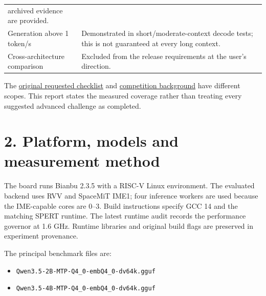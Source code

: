 \documentclass[10pt,a4paper]{article}
\providecommand{\tightlist}{\setlength{\itemsep}{0pt}\setlength{\parskip}{0pt}}
\begin{document}
\begin{longtable}[]{@{}ll@{}}
\begin{minipage}[t]{0.47\columnwidth}
archived evidence are provided.\strut
\end{minipage}\tabularnewline
\begin{minipage}[t]{0.47\columnwidth}\raggedright
Generation above 1 token/s\strut
\end{minipage} & \begin{minipage}[t]{0.47\columnwidth}\raggedright
Demonstrated in short/moderate-context decode tests; this is not
guaranteed at every long context.\strut
\end{minipage}\tabularnewline
\begin{minipage}[t]{0.47\columnwidth}\raggedright
Cross-architecture comparison\strut
\end{minipage} & \begin{minipage}[t]{0.47\columnwidth}\raggedright
Excluded from the release requirements at the user's direction.\strut
\end{minipage}\tabularnewline
\bottomrule
\end{longtable}

The
\href{https://github.com/MoyaMryia/riscv-accl/blob/main/spacemit/reports/2026-09-27-next-steps-and-measures.md}{original
requested checklist} and
\href{https://github.com/MoyaMryia/riscv-accl/blob/main/env/competition-background.md}{competition
background} have different scopes. This report states the measured
coverage rather than treating every suggested advanced challenge as
completed.

\hypertarget{platform-models-and-measurement-method}{%
\section{2. Platform, models and measurement
method}\label{platform-models-and-measurement-method}}

The board runs Bianbu 2.3.5 with a RISC-V Linux environment. The
evaluated backend uses RVV and SpaceMiT IME1; four inference workers are
used because the IME-capable cores are 0--3. Build instructions specify
GCC 14 and the matching SPERT runtime. The latest runtime audit records
the performance governor at 1.6 GHz. Runtime libraries and original
build flags are preserved in experiment provenance.

The principal benchmark files are:

\begin{itemize}
\tightlist
\item
  \nolinkurl{Qwen3.5-2B-MTP-Q4_0-embQ4_0-dv64k.gguf}
\item
  \nolinkurl{Qwen3.5-4B-MTP-Q4_0-embQ4_0-dv64k.gguf}
\end{itemize}
\end{document}
